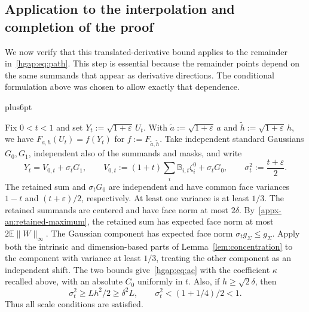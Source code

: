 \documentclass[11pt,letterpaper,twoside,leqno]{article}
\makeatletter
\theoremstyle{bookplain}
\theoremstyle{bookremark}
\renewenvironment{proof}[1][\proofname]{\par
  \pushQED{\qed}\normalfont\topsep6pt plus6pt\relax
  \trivlist\item[\hskip\labelsep\bfseries #1\@addpunct{.}]\ignorespaces
}{\popQED\endtrivlist\@endpefalse}
\newcommand{\E}{\mathbb E}
\makeatother
\begin{document}
\subsection{Application to the interpolation and completion of the proof}
\label{hgap:sec:completion}

We now verify that this translated-derivative bound applies to the
remainder in~\eqref{hgap:eq:path}. This step is essential because the
remainder points depend on the same summands that appear as derivative
directions. The conditional formulation above was chosen to allow
exactly that dependence.

\begin{proof}[Proof of the late bound~\eqref{hgap:eq:late}]
Fix $0<t<1$ and set $Y_t:=\sqrt{1+\varepsilon}\,U_t$. With
$\widetilde a:=\sqrt{1+\varepsilon}\,a$ and
$\widetilde h:=\sqrt{1+\varepsilon}\,h$, we have
$F_{a,h}(U_t)=f(Y_t)$ for $f:=F_{\widetilde a,\widetilde h}$.
Take independent standard Gaussians $G_0,G_1$, independent also of
the summands and masks, and write
\begin{equation}\label{hgap:eq:split}
 Y_t=V_{0,t}+\sigma_tG_1,\qquad
 V_{0,t}:=(1+t)\sum_i\mathbb B_{i,t}\zeta_i^0+\sigma_tG_0,
 \qquad \sigma_t^2:=\frac{t+\varepsilon}{2}.
\end{equation}
The retained sum and $\sigma_tG_0$ are independent and have common
face variances $1-t$ and $(t+\varepsilon)/2$, respectively. At least one
variance is at least $1/3$. The retained summands are centered and
have face norm at most $2\delta$. By~\eqref{appx-an:retained-maximum},
the retained sum has expected face norm at most $2\E\|W\|_\infty$.
The Gaussian component has expected face norm $\sigma_tg_\Sigma\le g_\Sigma$.
Apply both the intrinsic and dimension-based parts of
Lemma~\ref{lem:concentration} to the component with variance at least
$1/3$, treating the other component as an independent shift. The two
bounds give~\eqref{hgap:eq:ac} with the coefficient $\kappa$ recalled
above, with an absolute $C_0$ uniformly in $t$. Also, if $h\ge\sqrt2\delta$, then
\[
 \sigma_t^2\ge Lh^2/2\ge\delta^2L,
 \qquad \sigma_t^2<(1+1/4)/2<1.
\]
Thus all scale conditions are satisfied.


\end{proof}
\end{document}
